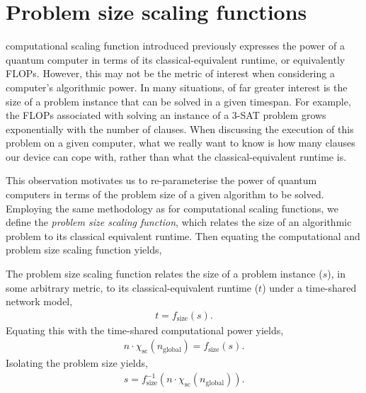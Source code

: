 %
%

\section{Problem size scaling functions}\label{sec:prob_sc_func}

 computational scaling function introduced previously expresses the power of a quantum computer in terms of its classical-equivalent runtime, or equivalently FLOPs. However, this may not be the metric of interest when considering a computer's algorithmic power. In many situations, of far greater interest is the size of a problem instance that can be solved in a given timespan. For example, the FLOPs associated with solving an instance of a 3-\textsc{SAT} problem grows exponentially with the number of clauses. When discussing the execution of this problem on a given computer, what we really want to know is how many clauses our device can cope with, rather than what the classical-equivalent runtime is.

This observation motivates us to re-parameterise the power of quantum computers in terms of the problem size of a given algorithm to be solved. Employing the same methodology as for computational scaling functions, we define the \textit{problem size scaling function}, which relates the size of an algorithmic problem to its classical equivalent runtime. Then equating the computational and problem size scaling function yields,

\begin{definition}
The problem size scaling function relates the size of a problem instance ($s$), in some arbitrary metric, to its classical-equivalent runtime ($t$) under a time-shared network model,
\begin{align}
t = f_\mathrm{size}(s).
\end{align}
Equating this with the time-shared computational power yields,
\begin{align}
	n\cdot \chi_\mathrm{sc}(n_\mathrm{global}) = f_\mathrm{size}(s).
\end{align}
Isolating the problem size yields,
\begin{align}
s = f_\mathrm{size}^{-1}(n\cdot \chi_\mathrm{sc}(n_\mathrm{global})).
\end{align}
\end{definition}

